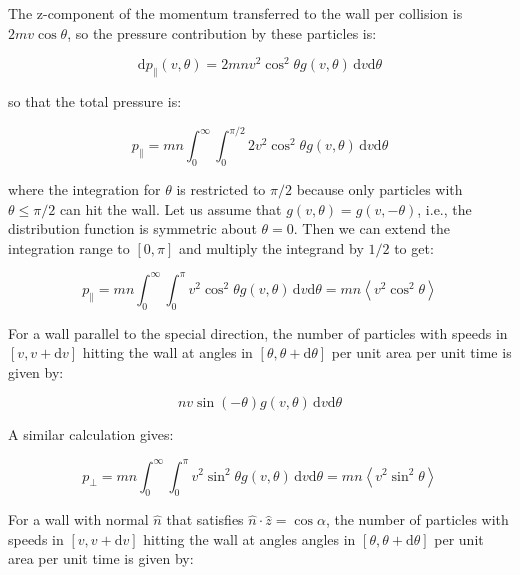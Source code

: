 \documentclass[12pt]{article}
\begin{document}
The z-component of the momentum transferred to the wall per collision is $2mv \cos{\theta}$, so the pressure contribution by these particles is:

\begin{equation}
    \mathrm{d}p_{\parallel}(v, \theta) = 2mnv^{2} \cos^{2}{\theta} g(v, \theta) \, \mathrm{d}v \mathrm{d}\theta
\end{equation}

so that the total pressure is:

\begin{equation}
    p_{\parallel} = mn \int_{0}^{\infty} \int_{0}^{\pi/2} 2v^{2} \cos^{2}{\theta} g(v, \theta) \, \mathrm{d}v \mathrm{d}\theta
\end{equation}

where the integration for $\theta$ is restricted to $\pi/2$ because only particles with $\theta \le \pi/2$ can hit the wall. Let us assume that $g(v, \theta) = g(v, -\theta)$, i.e., the distribution function is symmetric about $\theta = 0$. Then we can extend the integration range to $[0, \pi]$ and multiply the integrand by $1/2$ to get:

\begin{equation}
    p_{\parallel} = mn \int_{0}^{\infty} \int_{0}^{\pi} v^{2} \cos^{2}{\theta} g(v, \theta) \, \mathrm{d}v \mathrm{d}\theta = mn \left\langle v^{2} \cos^{2}{\theta} \right\rangle
\end{equation}

For a wall parallel to the special direction, the number of particles with speeds in $[v, v + \mathrm{d}v]$ hitting the wall at angles in $[\theta, \theta + \mathrm{d}\theta]$ per unit area per unit time is given by:

\begin{equation}
    nv \sin{(-\theta)} g(v, \theta) \, \mathrm{d}v \mathrm{d}\theta
\end{equation}

A similar calculation gives:

\begin{equation}
    p_{\perp} = mn \int_{0}^{\infty} \int_{0}^{\pi} v^{2} \sin^{2}{\theta} g(v, \theta) \, \mathrm{d}v \mathrm{d}\theta = mn \left\langle v^{2} \sin^{2}{\theta} \right\rangle
\end{equation}

For a wall with normal $\hat{n}$ that satisfies $\hat{n} \cdot \hat{z} = \cos{\alpha}$, the number of particles with speeds in $[v, v + \mathrm{d}v]$ hitting the wall at angles angles in $[\theta, \theta + \mathrm{d}\theta]$ per unit area per unit time is given by:
\end{document}
